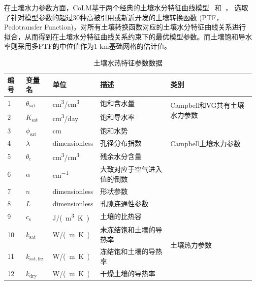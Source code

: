 在土壤水力参数方面，CoLM基于两个经典的土壤水分特征曲线模型~\citet{campbell1974} 和~\citet{van1980closed}，
选取了针对模型参数的超过30种高被引用或新近开发的土壤转换函数 (PTF， Pedotransfer Function)，对所有土壤转换函数对应的土壤水分特征曲线关系进行拟合，从而得到在土壤水分特征曲线关系约束下的最优模型参数。而土壤饱和导水率则采用多PTF的中位值作为1 km基础网格的估计值。

\begin{table}[htbp]
  \centering
  \begin{threeparttable}
    \caption{土壤水热特征参数数据}
    \label{tab:土壤水热特征参数数据}
    \begin{tabular}{lllll}
      \toprule
      编号 & 变量名                  & 单位                 & 描述                       & 类别                                            \\
      \midrule
      1    & $\theta_{\mathrm{sat}}$ & \unit{cm^3/cm^3}     & 饱和含水量                 & \multirow{2}{4cm}{Campbell和VG共有土壤水力参数} \\
      2    & $K_{\mathrm{sat}}$      & \unit{cm^3/day}      & 饱和导水率                 &                                                 \\
      3    & $\phi_{\mathrm{sat}}$   & \unit{cm}            & 饱和水势                   & \multirow{3}{3cm}{Campbell土壤水力参数}         \\
      4    & $\lambda$               & \unit{dimensionless} & 孔径分布指数               &                                                 \\
      5    & $\theta_{\mathrm{r}}$   & \unit{cm^3/cm^3}     & 残余水分含量               & \multirow{4}{4cm}{VG土壤水力参数}               \\
      6    & $\alpha$                & \unit{cm^{-1}}       & 大致对应于空气进入值的倒数 &                                                 \\
      7    & $n$                     & \unit{dimensionless} & 形状参数                   &                                                 \\
      8    & $L$                     & \unit{dimensionless} & 孔隙连通性参数             &                                                 \\
      9    & $c_{\mathrm{s}}$        & \unit{J/(m^3 K)}     & 土壤的比热容               & \multirow{4}{4cm}{土壤热力参数}                 \\
      10   & $k_{\mathrm{sat}}$      & \unit{W/(m K)}       & 未冻结饱和土壤的导热率     &                                                 \\
      11   & $k_{\mathrm{sat,frz}}$  & \unit{W/(m K)}       & 冻结饱和土壤的导热率       &                                                 \\
      12   & $k_{\mathrm{dry}}$      & \unit{W/(m K)}       & 干燥土壤的导热率           &                                                 \\

      \bottomrule
    \end{tabular}
  \end{threeparttable}
\end{table}

